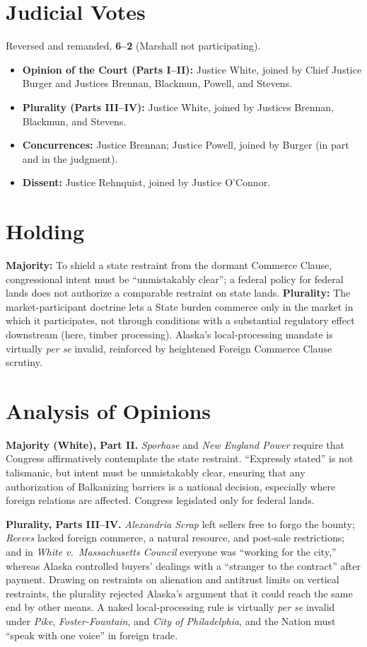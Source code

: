 \documentclass[12pt]{article}
\begin{document}
\section{Judicial Votes}

Reversed and remanded, \textbf{6--2} (Marshall not participating).
\begin{itemize}
\item \textbf{Opinion of the Court (Parts I--II):} Justice White, joined by Chief Justice Burger and Justices Brennan, Blackmun, Powell, and Stevens.
\item \textbf{Plurality (Parts III--IV):} Justice White, joined by Justices Brennan, Blackmun, and Stevens.
\item \textbf{Concurrences:} Justice Brennan; Justice Powell, joined by Burger (in part and in the judgment).
\item \textbf{Dissent:} Justice Rehnquist, joined by Justice O'Connor.
\end{itemize}

\section{Holding}

\textbf{Majority:} To shield a state restraint from the dormant Commerce Clause, congressional intent must be ``unmistakably clear''; a federal policy for federal lands does not authorize a comparable restraint on state lands. \textbf{Plurality:} The market-participant doctrine lets a State burden commerce only in the market in which it participates, not through conditions with a substantial regulatory effect downstream (here, timber processing). Alaska's local-processing mandate is virtually \textit{per se} invalid, reinforced by heightened Foreign Commerce Clause scrutiny.

\section{Analysis of Opinions}

\textbf{Majority (White), Part II.} \textit{Sporhase} and \textit{New England Power} require that Congress affirmatively contemplate the state restraint. ``Expressly stated'' is not talismanic, but intent must be unmistakably clear, ensuring that any authorization of Balkanizing barriers is a national decision, especially where foreign relations are affected. Congress legislated only for federal lands.

\textbf{Plurality, Parts III--IV.} \textit{Alexandria Scrap} left sellers free to forgo the bounty; \textit{Reeves} lacked foreign commerce, a natural resource, and post-sale restrictions; and in \textit{White v.\ Massachusetts Council} everyone was ``working for the city,'' whereas Alaska controlled buyers' dealings with a ``stranger to the contract'' after payment. Drawing on restraints on alienation and antitrust limits on vertical restraints, the plurality rejected Alaska's argument that it could reach the same end by other means. A naked local-processing rule is virtually \textit{per se} invalid under \textit{Pike}, \textit{Foster-Fountain}, and \textit{City of Philadelphia}, and the Nation must ``speak with one voice'' in foreign trade.
\end{document}

